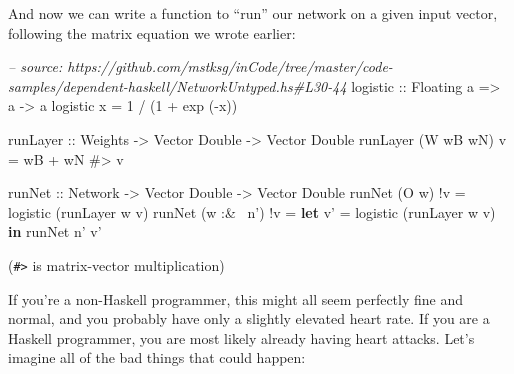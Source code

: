 \documentclass[]{article}
\newenvironment{Shaded}{}{}
\newcommand{\KeywordTok}[1]{\textcolor[rgb]{0.00,0.44,0.13}{\textbf{#1}}}
\newcommand{\DataTypeTok}[1]{\textcolor[rgb]{0.56,0.13,0.00}{#1}}
\newcommand{\DecValTok}[1]{\textcolor[rgb]{0.25,0.63,0.44}{#1}}
\newcommand{\CommentTok}[1]{\textcolor[rgb]{0.38,0.63,0.69}{\textit{#1}}}
\newcommand{\OtherTok}[1]{\textcolor[rgb]{0.00,0.44,0.13}{#1}}
\newcommand{\FunctionTok}[1]{\textcolor[rgb]{0.02,0.16,0.49}{#1}}
\newcommand{\NormalTok}[1]{#1}
\begin{document}
And now we can write a function to ``run'' our network on a given input vector,
following the matrix equation we wrote earlier:

\begin{Shaded}
\begin{Highlighting}[]
\CommentTok{-- source: https://github.com/mstksg/inCode/tree/master/code-samples/dependent-haskell/NetworkUntyped.hs#L30-44}
\OtherTok{logistic ::} \DataTypeTok{Floating}\NormalTok{ a }\OtherTok{=>}\NormalTok{ a }\OtherTok{->}\NormalTok{ a}
\NormalTok{logistic x }\FunctionTok{=} \DecValTok{1} \FunctionTok{/}\NormalTok{ (}\DecValTok{1} \FunctionTok{+}\NormalTok{ exp (}\FunctionTok{-}\NormalTok{x))}

\OtherTok{runLayer ::} \DataTypeTok{Weights} \OtherTok{->} \DataTypeTok{Vector} \DataTypeTok{Double} \OtherTok{->} \DataTypeTok{Vector} \DataTypeTok{Double}
\NormalTok{runLayer (}\DataTypeTok{W}\NormalTok{ wB wN) v }\FunctionTok{=}\NormalTok{ wB }\FunctionTok{+}\NormalTok{ wN }\FunctionTok{#>}\NormalTok{ v}

\OtherTok{runNet ::} \DataTypeTok{Network} \OtherTok{->} \DataTypeTok{Vector} \DataTypeTok{Double} \OtherTok{->} \DataTypeTok{Vector} \DataTypeTok{Double}
\NormalTok{runNet (}\DataTypeTok{O}\NormalTok{ w)      }\FunctionTok{!}\NormalTok{v }\FunctionTok{=}\NormalTok{ logistic (runLayer w v)}
\NormalTok{runNet (w }\FunctionTok{:&~}\NormalTok{ n') }\FunctionTok{!}\NormalTok{v }\FunctionTok{=} \KeywordTok{let}\NormalTok{ v' }\FunctionTok{=}\NormalTok{ logistic (runLayer w v)}
                       \KeywordTok{in}\NormalTok{  runNet n' v'}
\end{Highlighting}
\end{Shaded}

(\texttt{\#\textgreater{}} is matrix-vector multiplication)

If you're a non-Haskell programmer, this might all seem perfectly fine and
normal, and you probably have only a slightly elevated heart rate. If you are a
Haskell programmer, you are most likely already having heart attacks. Let's
imagine all of the bad things that could happen:
\end{document}
